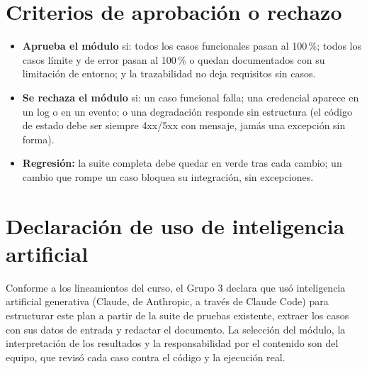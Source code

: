 \documentclass[11pt,a4paper]{article}
\begin{document}
\section{Criterios de aprobación o rechazo}

\begin{itemize}
\item \textbf{Aprueba el módulo} si: todos los casos funcionales pasan al 100\,\%; todos los casos límite y de error pasan al 100\,\% o quedan documentados con su limitación de entorno; y la trazabilidad no deja requisitos sin casos.
\item \textbf{Se rechaza el módulo} si: un caso funcional falla; una credencial aparece en un log o en un evento; o una degradación responde sin estructura (el código de estado debe ser siempre 4xx/5xx con mensaje, jamás una excepción sin forma).
\item \textbf{Regresión:} la suite completa debe quedar en verde tras cada cambio; un cambio que rompe un caso bloquea su integración, sin excepciones.
\end{itemize}

\section{Declaración de uso de inteligencia artificial}
Conforme a los lineamientos del curso, el Grupo 3 declara que usó inteligencia artificial generativa (Claude, de Anthropic, a través de Claude Code) para estructurar este plan a partir de la suite de pruebas existente, extraer los casos con sus datos de entrada y redactar el documento. La selección del módulo, la interpretación de los resultados y la responsabilidad por el contenido son del equipo, que revisó cada caso contra el código y la ejecución real.
\end{document}
